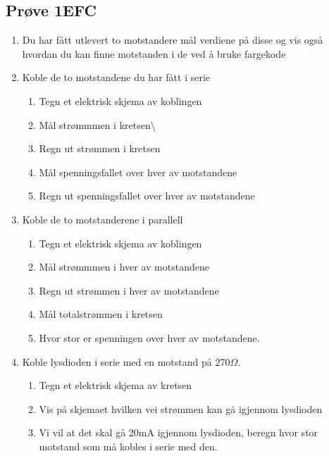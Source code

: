 \documentclass[12pt,a4paper]{article}
\begin{document}
\subsection{Prøve 1EFC}
\begin{enumerate}
\item Du har fått utlevert to motstandere mål verdiene på disse og vis også
hvordan du kan finne motstanden i de ved å bruke fargekode
\item Koble de to motstandene du har fått i serie
\begin{enumerate}
\item Tegn et elektrisk skjema av koblingen
\item Mål strømmmen i kretsen\textbackslash{}
\item Regn ut strømmen i kretsen
\item Mål spenningsfallet over hver av motstandene
\item Regn ut spenningsfallet over hver av motstandene
\end{enumerate}
\item Koble de to motstanderene i parallell
\begin{enumerate}
\item Tegn et elektrisk skjema av koblingen
\item Mål strømmmen i hver av motstandene
\item Regn ut strømmen i hver av motstandene
\item Mål totalstrømmen i kretsen
\item Hvor stor er spenningen over hver av motstandene.
\end{enumerate}
\item Koble lysdioden i serie med en motstand på 270$\Omega$.
\begin{enumerate}
\item Tegn et elektrisk skjema av kretsen
\item Vis på skjemaet hvilken vei strømmen kan gå igjennom lysdioden
\item Vi vil at det skal gå 20mA igjennom lysdioden, beregn hvor stor motstand
som må kobles i serie med den. 
\end{enumerate}
\end{enumerate}
\end{document}
